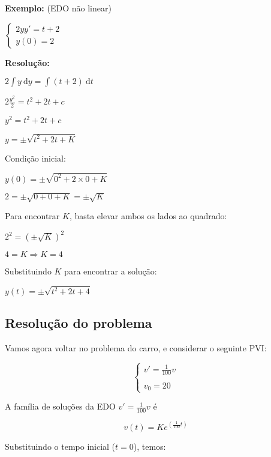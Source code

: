 \documentclass[a4paper]{article}
\newcommand{\ud}{\mathrm{\ d}}
\begin{document}
\hrulefill

\begin{multicols}{2}
{\bf Exemplo:} (EDO não linear)

$
\left\{
  \begin{array}{l}
    2yy'=t+2\\
    y(0)=2
  \end{array}
\right.
$

\bigskip
{\bf Resolução:}

$2\int y \ud y = \int (t+2) \ud t$

$2\frac{y^2}{2} = t^2 + 2t + c$

$y^2 = t^2 + 2t + c$

$y = \pm \sqrt{t^2 + 2t +K}$

Condição inicial:

$y(0)=\pm \sqrt{0^2 + 2\times 0 +K}$

$2 = \pm \sqrt{0 + 0 +K} = \pm \sqrt{K}$

Para encontrar $K$, basta elevar ambos os lados ao quadrado:

$2^2 = \left( \pm \sqrt{K} \right)^2$

$4 = K \Rightarrow K=4$

Substituindo $K$ para encontrar a solução:

$y(t) = \pm \sqrt{t^2 + 2t +4}$
\end{multicols}

\hrulefill

\subsection{Resolução do problema}

Vamos agora voltar no problema do carro, e considerar o seguinte PVI:

\begin{displaymath}
  \left\{
    \begin{array}{l}
      v'=\frac{1}{100}v\\
      \\
      v_0 = 20
    \end{array}
  \right.
\end{displaymath}

A família de soluções da EDO $v'=\frac{1}{100}v$ é

\begin{displaymath}
  v(t) = Ke^{(\frac{1}{100}t)}
\end{displaymath}

Substituindo o tempo inicial ($t=0$), temos:
\end{document}
